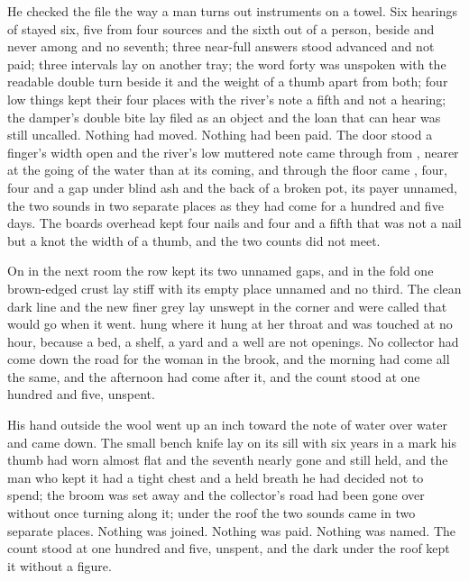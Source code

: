 He checked the file the way a man turns out instruments on a towel. Six hearings of  stayed six, five from four sources and the sixth out of a person, beside and never among and no seventh; three near-full answers stood advanced and not paid; three intervals lay on another tray; the word forty was unspoken with the readable double turn beside it and the weight of a thumb apart from both; four low things kept their four places with the river's note a fifth and not a hearing; the damper's double bite lay filed as an object and the loan that can hear was still uncalled. Nothing had moved. Nothing had been paid. The door stood a finger's width open and the river's low muttered note came through from , nearer at the going of the water than at its coming, and through the floor came , four, four and a gap under blind ash and the back of a broken pot, its payer unnamed, the two sounds in two separate places as they had come for a hundred and five days. The boards overhead kept four nails and four and a fifth that was not a nail but a knot the width of a thumb, and the two counts did not meet.

On  in the next room the row kept its two unnamed gaps, and in the fold one brown-edged crust lay stiff with its empty place unnamed and no third. The clean dark line and the new finer grey lay unswept in the corner and were called  that would go when it went.  hung where it hung at her throat and was touched at no hour, because a bed, a shelf, a yard and a well are not openings. No collector had come down the road for the woman in the brook, and the morning had come all the same, and the afternoon had come after it, and the count stood at one hundred and five, unspent.

His hand outside the wool went up an inch toward the note of water over water and came down. The small bench knife lay on its sill with six years in a mark his thumb had worn almost flat and the seventh nearly gone and still held, and the man who kept it had a tight chest and a held breath he had decided not to spend; the broom was set away and the collector's road had been gone over without once turning along it; under the roof the two sounds came in two separate places. Nothing was joined. Nothing was paid. Nothing was named. The count stood at one hundred and five, unspent, and the dark under the roof kept it without a figure.
